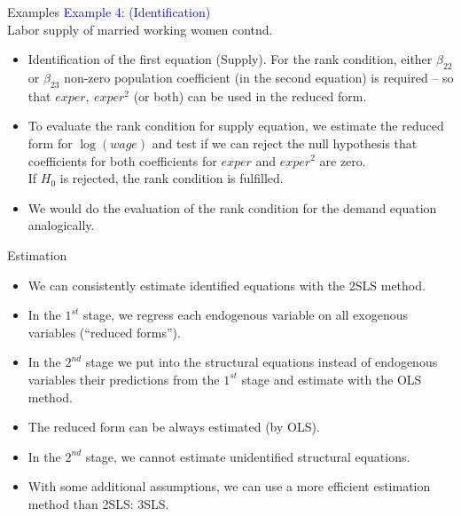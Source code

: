 \documentclass[usenames,dvipsnames]{beamer}
\begin{document}
\begin{frame}{Examples}
\textcolor{Blue}{Example 4: (Identification)}\\ Labor supply of married working women contnd.\\
\bigskip
\begin{itemize}
\item Identification of the first equation (Supply). For the rank condition, either $\beta_{22}$ or $\beta_{23}$ non-zero population coefficient (in the second equation) is required -- so that $\textit{exper},~\textit{exper}^2$ (or both) can be used in the reduced form.
\medskip
\item To evaluate the rank condition for supply equation, we estimate the reduced form for $\log(\textit{wage})$ and test if we can reject the null hypothesis that coefficients for both coefficients for $exper$ and $\textit{exper}^2$ are zero. \\If $H_0$ is rejected, the rank condition is fulfilled.\\
\medskip
\item We would do the evaluation of the rank condition for the demand equation analogically.
\end{itemize}
\end{frame}
\begin{frame}{Estimation}
\begin{itemize}
\item We can consistently estimate identified equations with the 2SLS method. \vspace{0.2cm}
\item In the $1^{st}$ stage, we regress each endogenous variable on all exogenous variables (``reduced forms'').
\vspace{0.2cm}
\item In the $2^{nd}$ stage we put into the structural equations instead of endogenous variables their predictions from the $1^{st}$ stage and estimate with the OLS method. 
\vspace{0.2cm}
\item The reduced form can be always estimated (by OLS).
\vspace{0.2cm}
\item In the $2^{nd}$ stage, we cannot estimate unidentified structural equations. 
\vspace{0.2cm}
\item With some additional assumptions, we can use a more efficient estimation method than 2SLS: 3SLS.
\end{itemize}
\end{frame}
\end{document}
